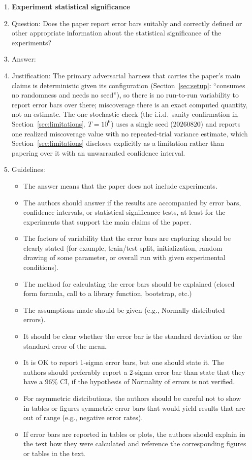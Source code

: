 \begin{enumerate}
\item {\bf Experiment statistical significance}
    \item[] Question: Does the paper report error bars suitably and correctly defined or other appropriate information about the statistical significance of the experiments?
    \item[] Answer: \answerNo{}
    \item[] Justification: The primary adversarial harness that carries the paper's main claims is deterministic given its configuration (Section~\ref{sec:setup}: ``consumes no randomness and needs no seed''), so there is no run-to-run variability to report error bars over there; miscoverage there is an exact computed quantity, not an estimate. The one stochastic check (the i.i.d.\ sanity confirmation in Section~\ref{sec:limitations}, $T=10^6$) uses a single seed ($20260820$) and reports one realized miscoverage value with no repeated-trial variance estimate, which Section~\ref{sec:limitations} discloses explicitly as a limitation rather than papering over it with an unwarranted confidence interval.
    \item[] Guidelines:
    \begin{itemize}
        \item The answer \answerNA{} means that the paper does not include experiments.
        \item The authors should answer \answerYes{} if the results are accompanied by error bars, confidence intervals, or statistical significance tests, at least for the experiments that support the main claims of the paper.
        \item The factors of variability that the error bars are capturing should be clearly stated (for example, train/test split, initialization, random drawing of some parameter, or overall run with given experimental conditions).
        \item The method for calculating the error bars should be explained (closed form formula, call to a library function, bootstrap, etc.)
        \item The assumptions made should be given (e.g., Normally distributed errors).
        \item It should be clear whether the error bar is the standard deviation or the standard error of the mean.
        \item It is OK to report 1-sigma error bars, but one should state it. The authors should preferably report a 2-sigma error bar than state that they have a 96\% CI, if the hypothesis of Normality of errors is not verified.
        \item For asymmetric distributions, the authors should be careful not to show in tables or figures symmetric error bars that would yield results that are out of range (e.g., negative error rates).
        \item If error bars are reported in tables or plots, the authors should explain in the text how they were calculated and reference the corresponding figures or tables in the text.
    \end{itemize}


\end{enumerate}
